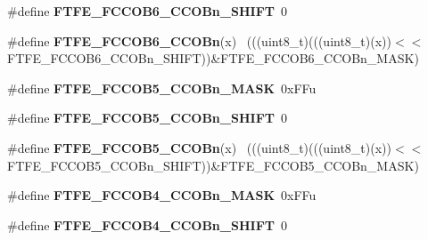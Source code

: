 \begin{DoxyCompactItemize}
\item 
\hypertarget{group___f_t_f_e___register___masks_ga5271e588fb67a85b91f350cd6e15e3d4}{}\#define {\bfseries F\+T\+F\+E\+\_\+\+F\+C\+C\+O\+B6\+\_\+\+C\+C\+O\+Bn\+\_\+\+S\+H\+I\+F\+T}~0\label{group___f_t_f_e___register___masks_ga5271e588fb67a85b91f350cd6e15e3d4}

\item 
\hypertarget{group___f_t_f_e___register___masks_ga0bcec0b810a221815ecfef87a4b6577e}{}\#define {\bfseries F\+T\+F\+E\+\_\+\+F\+C\+C\+O\+B6\+\_\+\+C\+C\+O\+Bn}(x)                                      ~(((uint8\+\_\+t)(((uint8\+\_\+t)(x))$<$$<$F\+T\+F\+E\+\_\+\+F\+C\+C\+O\+B6\+\_\+\+C\+C\+O\+Bn\+\_\+\+S\+H\+I\+F\+T))\&F\+T\+F\+E\+\_\+\+F\+C\+C\+O\+B6\+\_\+\+C\+C\+O\+Bn\+\_\+\+M\+A\+S\+K)\label{group___f_t_f_e___register___masks_ga0bcec0b810a221815ecfef87a4b6577e}

\item 
\hypertarget{group___f_t_f_e___register___masks_ga1fed27b766792ecc82407cbddb36d6f8}{}\#define {\bfseries F\+T\+F\+E\+\_\+\+F\+C\+C\+O\+B5\+\_\+\+C\+C\+O\+Bn\+\_\+\+M\+A\+S\+K}~0x\+F\+Fu\label{group___f_t_f_e___register___masks_ga1fed27b766792ecc82407cbddb36d6f8}

\item 
\hypertarget{group___f_t_f_e___register___masks_gaec76e9576208928867d1f819be0a8c66}{}\#define {\bfseries F\+T\+F\+E\+\_\+\+F\+C\+C\+O\+B5\+\_\+\+C\+C\+O\+Bn\+\_\+\+S\+H\+I\+F\+T}~0\label{group___f_t_f_e___register___masks_gaec76e9576208928867d1f819be0a8c66}

\item 
\hypertarget{group___f_t_f_e___register___masks_ga02a158701ece8a86abe601df8ec5b4b6}{}\#define {\bfseries F\+T\+F\+E\+\_\+\+F\+C\+C\+O\+B5\+\_\+\+C\+C\+O\+Bn}(x)                                      ~(((uint8\+\_\+t)(((uint8\+\_\+t)(x))$<$$<$F\+T\+F\+E\+\_\+\+F\+C\+C\+O\+B5\+\_\+\+C\+C\+O\+Bn\+\_\+\+S\+H\+I\+F\+T))\&F\+T\+F\+E\+\_\+\+F\+C\+C\+O\+B5\+\_\+\+C\+C\+O\+Bn\+\_\+\+M\+A\+S\+K)\label{group___f_t_f_e___register___masks_ga02a158701ece8a86abe601df8ec5b4b6}

\item 
\hypertarget{group___f_t_f_e___register___masks_gad17f10cdfff46d245fa4c9511a45e205}{}\#define {\bfseries F\+T\+F\+E\+\_\+\+F\+C\+C\+O\+B4\+\_\+\+C\+C\+O\+Bn\+\_\+\+M\+A\+S\+K}~0x\+F\+Fu\label{group___f_t_f_e___register___masks_gad17f10cdfff46d245fa4c9511a45e205}

\item 
\hypertarget{group___f_t_f_e___register___masks_ga83b627db8362dc2297b26ecbf2cae0a6}{}\#define {\bfseries F\+T\+F\+E\+\_\+\+F\+C\+C\+O\+B4\+\_\+\+C\+C\+O\+Bn\+\_\+\+S\+H\+I\+F\+T}~0\label{group___f_t_f_e___register___masks_ga83b627db8362dc2297b26ecbf2cae0a6}


\end{DoxyCompactItemize}
